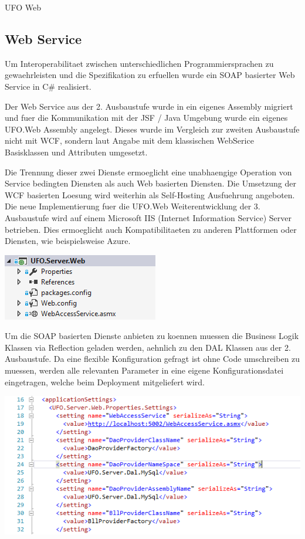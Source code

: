 \begin{section}{UFO Web}

\subsection{Web Service}

Um Interoperabilitaet zwischen unterschiedlichen Programmiersprachen zu gewaehrleisten und die Spezifikation zu erfuellen wurde ein SOAP basierter Web Service in C\# realisiert. 

Der Web Service aus der 2. Ausbaustufe wurde in ein eigenes Assembly migriert und fuer die Kommunikation mit der JSF / Java Umgebung wurde ein eigenes UFO.Web Assembly angelegt. Dieses wurde im Vergleich zur zweiten Ausbaustufe nicht mit WCF, sondern laut Angabe mit dem klassischen WebSerice Basisklassen und Attributen umgesetzt. 

Die Trennung dieser zwei Dienste ermoeglicht eine unabhaengige Operation von Service bedingten Diensten als auch Web basierten Diensten. Die Umsetzung der WCF basierten Loesung wird weiterhin als Self-Hosting Ausfuehrung angeboten. Die neue Implementierung fuer die UFO.Web Weiterentwicklung der 3. Ausbaustufe wird auf einem Microsoft IIS (Internet Information Service) Server betrieben. Dies ermoeglicht auch Kompatibilitaeten zu anderen Plattformen oder Diensten, wie beispielsweise Azure.

\includegraphics[angle=0, scale=0.45]{./img/3_ausb_assembly.PNG}
\FloatBarrier

Um die SOAP basierten Dienste anbieten zu koennen muessen die Business Logik Klassen via Reflection geladen werden, aehnlich zu den DAL Klassen aus der 2. Ausbaustufe. Da eine flexible Konfiguration gefragt ist ohne Code umschreiben zu muessen, werden alle relevanten Parameter in eine eigene Konfigurationsdatei eingetragen, welche beim Deployment mitgeliefert wird. 

\includegraphics[angle=0, scale=0.45]{./img/3_ausb_config.PNG}
\FloatBarrier


\end{section}
